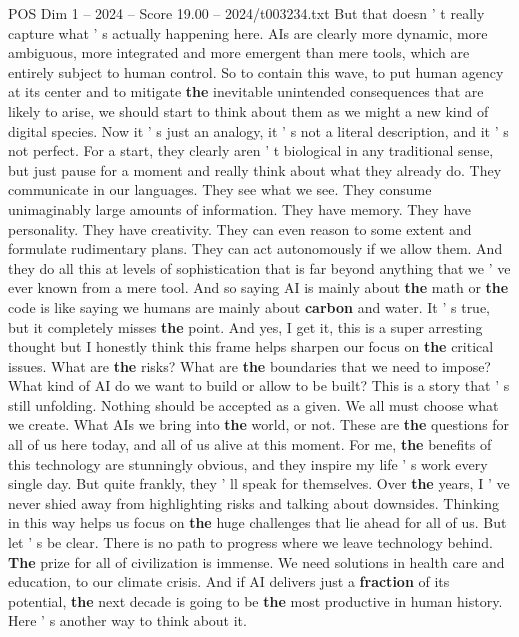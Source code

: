 \begin{textsample}{POS Dim 1 – 2024 – Score 19.00 – 2024/t003234.txt}
But that doesn ' t really capture what ' s actually happening here.
AIs are clearly more dynamic, more ambiguous, more integrated and more emergent than mere tools, which are entirely subject to human control.
So to contain this wave, to put human agency at its center and to mitigate \textbf{the} inevitable unintended consequences that are likely to arise, we should start to think about them as we might a new kind of digital species.
Now it ' s just an analogy, it ' s not a literal description, and it ' s not perfect.
For a start, they clearly aren ' t biological in any traditional sense, but just pause for a moment and really think about what they already do.
They communicate in our languages.
They see what we see.
They consume unimaginably large amounts of information.
They have memory.
They have personality.
They have creativity.
They can even reason to some extent and formulate rudimentary plans.
They can act autonomously if we allow them.
And they do all this at levels of sophistication that is far beyond anything that we ' ve ever known from a mere tool.
And so saying AI is mainly about \textbf{the} math or \textbf{the} code is like saying we humans are mainly about \textbf{carbon} and water.
It ' s true, but it completely misses \textbf{the} point.
And yes, I get it, this is a super arresting thought but I honestly think this frame helps sharpen our focus on \textbf{the} critical issues.
What are \textbf{the} risks?
What are \textbf{the} boundaries that we need to impose?
What kind of AI do we want to build or allow to be built?
This is a story that ' s still unfolding.
Nothing should be accepted as a given.
We all must choose what we create.
What AIs we bring into \textbf{the} world, or not.
These are \textbf{the} questions for all of us here today, and all of us alive at this moment.
For me, \textbf{the} benefits of this technology are stunningly obvious, and they inspire my life ' s work every single day.
But quite frankly, they ' ll speak for themselves.
Over \textbf{the} years, I ' ve never shied away from highlighting risks and talking about downsides.
Thinking in this way helps us focus on \textbf{the} huge challenges that lie ahead for all of us.
But let ' s be clear.
There is no path to progress where we leave technology behind. \textbf{The} prize for all of civilization is immense.
We need solutions in health care and education, to our climate crisis.
And if AI delivers just a \textbf{fraction} of its potential, \textbf{the} next decade is going to be \textbf{the} most productive in human history.
Here ' s another way to think about it.

\end{textsample}
